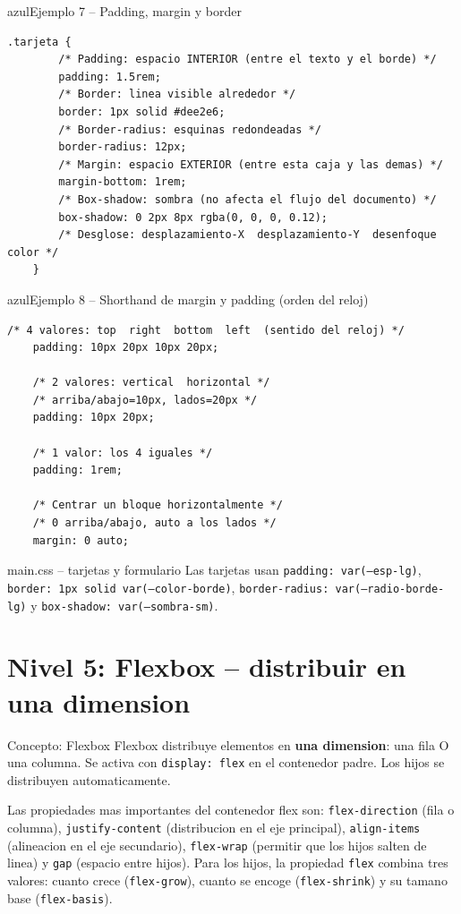 \documentclass[11pt,a4paper]{article}
\begin{document}
	\begin{cajacodigo}{azul}{Ejemplo 7 -- Padding, margin y border}
		\begin{lstlisting}[style=codecss]
	.tarjeta {
		/* Padding: espacio INTERIOR (entre el texto y el borde) */
		padding: 1.5rem;
		/* Border: linea visible alrededor */
		border: 1px solid #dee2e6;
		/* Border-radius: esquinas redondeadas */
		border-radius: 12px;
		/* Margin: espacio EXTERIOR (entre esta caja y las demas) */
		margin-bottom: 1rem;
		/* Box-shadow: sombra (no afecta el flujo del documento) */
		box-shadow: 0 2px 8px rgba(0, 0, 0, 0.12);
		/* Desglose: desplazamiento-X  desplazamiento-Y  desenfoque  color */
	} \end{lstlisting}
	\end{cajacodigo}
	
	\begin{cajacodigo}{azul}{Ejemplo 8 -- Shorthand de margin y padding (orden del reloj)}
		\begin{lstlisting}[style=codecss]
	/* 4 valores: top  right  bottom  left  (sentido del reloj) */
	padding: 10px 20px 10px 20px;
	
	/* 2 valores: vertical  horizontal */
	/* arriba/abajo=10px, lados=20px */
	padding: 10px 20px;   
	
	/* 1 valor: los 4 iguales */
	padding: 1rem;
	
	/* Centrar un bloque horizontalmente */
	/* 0 arriba/abajo, auto a los lados */ 
	margin: 0 auto;  \end{lstlisting}
	\end{cajacodigo}
	
	\begin{cajapractica}{main.css -- tarjetas y formulario}
		Las tarjetas usan \texttt{padding: var(--esp-lg)}, \texttt{border: 1px solid var(--color-borde)}, \texttt{border-radius: var(--radio-borde-lg)} y \texttt{box-shadow: var(--sombra-sm)}.
	\end{cajapractica}
	
	\section{Nivel 5: Flexbox -- distribuir en una dimension}
	
	\begin{cajaconcepto}{Concepto: Flexbox}
		Flexbox distribuye elementos en \textbf{una dimension}: una fila O una columna. Se activa con \texttt{display: flex} en el contenedor padre. Los hijos se distribuyen automaticamente.
		
		Las propiedades mas importantes del contenedor flex son: \texttt{flex-direction} (fila o columna), \texttt{justify-content} (distribucion en el eje principal), \texttt{align-items} (alineacion en el eje secundario), \texttt{flex-wrap} (permitir que los hijos salten de linea) y \texttt{gap} (espacio entre hijos). Para los hijos, la propiedad \texttt{flex} combina tres valores: cuanto crece (\texttt{flex-grow}), cuanto se encoge (\texttt{flex-shrink}) y su tamano base (\texttt{flex-basis}).
	\end{cajaconcepto}
	
\end{document}
